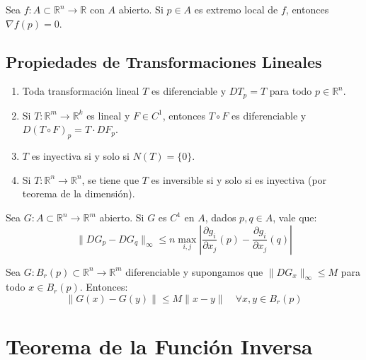 \begin{theorem}
    Sea \(f: A \subset \mathbb{R}^n \to \mathbb{R}\) con \(A\) abierto. Si \(p \in A\) es extremo local de \(f\), entonces \(\nabla f(p) = 0\).
\end{theorem}

\subsection{Propiedades de Transformaciones Lineales}
\begin{enumerate}
    \item Toda transformación lineal \(T\) es diferenciable y \(DT_p = T\) para todo \(p \in \mathbb{R}^n\).
    \item Si \(T: \mathbb{R}^m \to \mathbb{R}^k\) es lineal y \(F \in C^1\), entonces \(T \circ F\) es diferenciable y \(D(T \circ F)_p = T \cdot DF_p\).
    \item \(T\) es inyectiva si y solo si \(N(T) = \{0\}\).
    \item Si \(T: \mathbb{R}^n \to \mathbb{R}^n\), se tiene que \(T\) es inversible si y solo si es inyectiva (por teorema de la dimensión).
\end{enumerate}

\begin{lemma}
    Sea \(G: A \subset \mathbb{R}^n \to \mathbb{R}^m\) abierto. Si \(G\) es \(C^1\) en \(A\), dados \(p, q \in A\), vale que:
    \[ \| DG_p - DG_q \|_{\infty} \le n \max_{i,j} \left| \frac{\partial g_i}{\partial x_j}(p) - \frac{\partial g_i}{\partial x_j}(q) \right| \]
\end{lemma}

\begin{lemma}
    Sea \(G: B_r(p) \subset \mathbb{R}^n \to \mathbb{R}^m\) diferenciable y supongamos que \(\| DG_x \|_{\infty} \le M\) para todo \(x \in B_r(p)\). Entonces:
    \[ \| G(x) - G(y) \| \le M \| x - y \| \quad \forall x,y \in B_r(p) \]
\end{lemma}

\section{Teorema de la Función Inversa}

